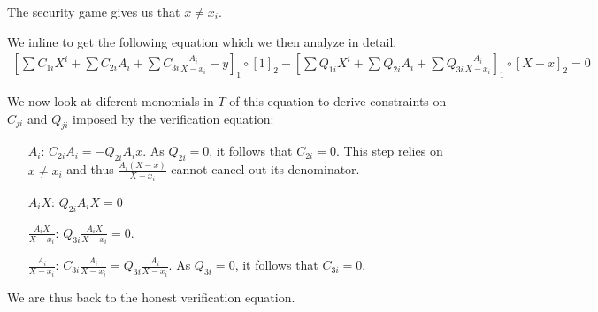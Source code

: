 \documentclass[runningheads,11pt]{llncs}
\begin{document}
The security game gives us that $x \neq x_{i}$.

We inline to get the following equation which we then analyze in detail,
\begin{align*}
  \left[\sum C_{1i} X^{i} + \sum C_{2i} A_{i} + \sum C_{3i} \frac{A_{i}}{X-x_{i}} - y\right]_{1} \circ [1]_{2} - \left[\sum Q_{1i} X^{i} + \sum Q_{2i} A_{i} + \sum Q_{3i} \frac{A_{i}}{X-x_{i}}\right]_{1} \circ [X-x]_{2} = 0
  \end{align*}

We now look at diferent monomials in $T$ of this equation to derive constraints on $C_{ji}$ and $Q_{ji}$ imposed by the verification equation:
\begin{itemize}
  \item[$A_{i}$:] $C_{2i} A_{i} = - Q_{2i}A_{i} x$. As $Q_{2i}=0$, it follows
        that $C_{{2i}}=0$. This step relies on $x \neq x_{i}$ and thus
        $\frac{A_{i} (X-x)}{X-x_{i}}$ cannot cancel out its denominator.
  \item[$A_{i}X$:] $Q_{2i} A_{i} X = 0$
  \item[$\frac{A_{i}X}{X-x_{i}}$:] $Q_{3i} \frac{A_{i} X}{X-x_{i}} = 0$.
  \item[$\frac{A_{i}}{X-x_{i}}$:]
        $C_{3i} \frac{A_{i}}{X-x_{i}} = Q_{{3i}} \frac{A_{i}}{X-x_{i}} $. As $Q_{3i}=0$, it follows
        that $C_{{3i}}=0$.
      \end{itemize}

      We are thus back to the honest verification equation.



\end{document}
